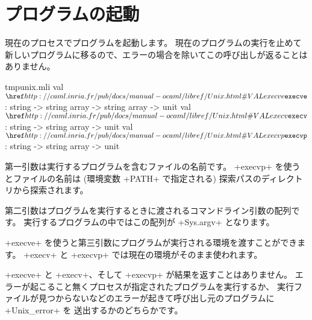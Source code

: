 \medskip

\section{プログラムの起動}

現在のプロセスでプログラムを起動します。
現在のプログラムの実行を止めて新しいプログラムに移るので、エラーの場合を除いてこの呼び出しが返ることはありません。
%
\begin{listingcodefile}{tmpunix.mli}
val $\libvalue{Unix}{execve}$ : string -> string array -> string array -> unit
val $\libvalue{Unix}{execv}$  : string -> string array -> unit
val $\libvalue{Unix}{execvp}$ : string -> string array -> unit
\end{listingcodefile}
%
第一引数は実行するプログラムを含むファイルの名前です。
\ml+execvp+ を使うとファイルの名前は (環境変数 \ml+PATH+ で指定される) 探索パスのディレクトリから探索されます。

第二引数はプログラムを実行するときに渡されるコマンドライン引数の配列です。
実行するプログラムの中ではこの配列が \ml+Sys.argv+ となります。

\ml+execve+ を使うと第三引数にプログラムが実行される環境を渡すことができます。
\ml+execv+ と \ml+execvp+ では現在の環境がそのまま使われます。

\ml+execve+ と \ml+execv+、そして \ml+execvp+ が結果を返すことはありません。
エラーが起こること無くプロセスが指定されたプログラムを実行するか、
実行ファイルが見つからないなどのエラーが起きて呼び出し元のプログラムに \ml+Unix_error+ を
送出するかのどちらかです。

